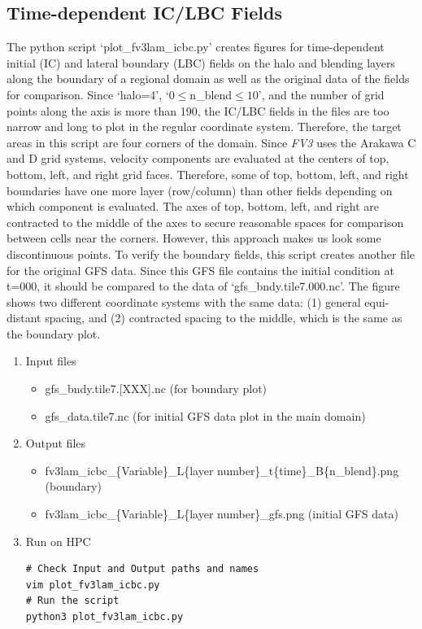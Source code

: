 \documentclass[11pt,fleqn]{report}              %
\begin{document}
\subsection{Time-dependent IC/LBC Fields}

The python script `plot\_fv3lam\_icbc.py' creates figures for time-dependent initial (IC) and lateral boundary (LBC) fields on the halo and blending layers along the boundary of a regional domain as well as the original data of the fields for comparison. Since `halo=4', `$0\le$n\_blend$\le10$', and the number of grid points along the axis is more than 190, the IC/LBC fields in the files are too narrow and long to plot in the regular coordinate system. Therefore, the target areas in this script are four corners of the domain. Since {\it FV3} uses the Arakawa C and D grid systems, velocity components are evaluated at the centers of top, bottom, left, and right grid faces. Therefore, some of top, bottom, left, and right boundaries have one more layer (row/column) than other fields depending on which component is evaluated. The axes of top, bottom, left, and right are contracted to the middle of the axes to secure reasonable spaces for comparison between cells near the corners. However, this approach makes us look some discontinuous points. To verify the boundary fields, this script creates another file for the original GFS data. Since this GFS file contains the initial condition at t=000, it should be compared to the data of `gfs\_bndy.tile7.000.nc'. The figure shows two different coordinate systems with the same data: (1) general equi-distant spacing, and (2) contracted spacing to the middle, which is the same as the boundary plot.

\begin{enumerate}
\item Input files
\begin{itemize}
\item gfs\_bndy.tile7.[XXX].nc     (for boundary plot)
\item gfs\_data.tile7.nc     (for initial GFS data plot in the main domain)
\end{itemize}
\item Output files
\begin{itemize}
\item fv3lam\_icbc\_\{Variable\}\_L\{layer number\}\_t\{time\}\_B\{n\_blend\}.png (boundary)
\item fv3lam\_icbc\_\{Variable\}\_L\{layer number\}\_gfs.png (initial GFS data)
\end{itemize}
\item Run on HPC

\lstset{language=bash}   
\begin{lstlisting}[frame=trBL]
# Check Input and Output paths and names
vim plot_fv3lam_icbc.py
# Run the script
python3 plot_fv3lam_icbc.py
\end{lstlisting}

\end{enumerate}
\end{document}
